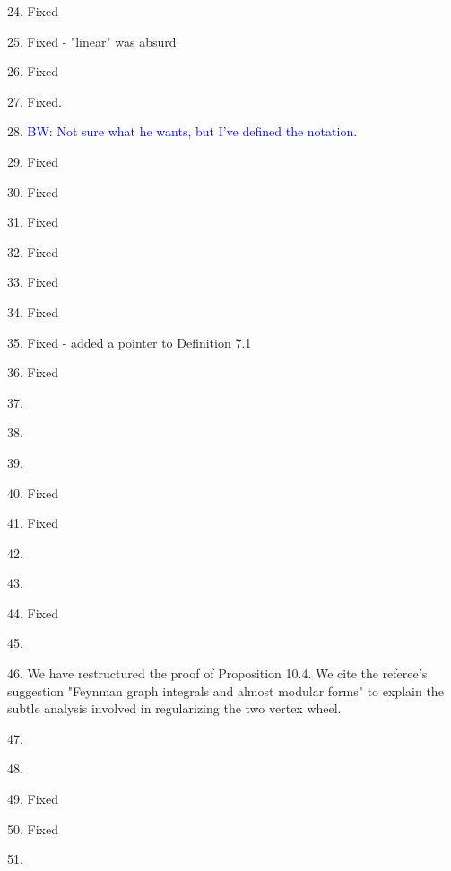 \documentclass[10pt]{amsart}
\def\brian{\textcolor{blue}{BW: }\textcolor{blue}}
\begin{document}
24. Fixed

25. Fixed - "linear" was absurd

26. Fixed

27. Fixed.

28. \brian{Not sure what he wants, but I've defined the notation.}

29. Fixed

30. Fixed

31. Fixed

32. Fixed

33. Fixed

34. Fixed

35. Fixed - added a pointer to Definition 7.1

36. Fixed

37.

38.

39.

40. Fixed

41. Fixed

42.

43. 

44. Fixed

45.

46. We have restructured the proof of Proposition 10.4.
We cite the referee's suggestion "Feynman graph integrals and almost modular forms" to explain the subtle analysis involved in regularizing the two vertex wheel.

47.

48.

49. Fixed

50. Fixed

51.
\end{document}
